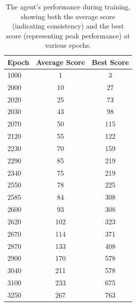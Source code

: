\documentclass[a4paper,12pt]{article}
\begin{document}
\begin{table}[!ht]
    \centering
    \begin{tabular}{|l|c|c|}
    \hline
    \textbf{Epoch} & \textbf{Average Score} & \textbf{Best Score} \\ \hline
    1000        & 1                         & 3                   \\ \hline
    2000        & 10                        & 27                  \\ \hline
    2020        & 25                        & 73                  \\ \hline
    2030        & 43                        & 98                  \\ \hline
    2070        & 50                        & 115                 \\ \hline
    2120        & 55                        & 122                 \\ \hline
    2230        & 70                        & 159                 \\ \hline
    2290        & 85                        & 219                 \\ \hline
    2340        & 75                        & 219                 \\ \hline
    2550        & 78                        & 225                 \\ \hline
    2585        & 84                        & 308                 \\ \hline
    2600        & 93                        & 308                 \\ \hline
    2620        & 102                       & 323                 \\ \hline
    2670        & 114                       & 371                 \\ \hline
    2870        & 133                       & 408                 \\ \hline
    2900        & 170                       & 578                 \\ \hline
    3040        & 211                       & 578                 \\ \hline
    3100        & 233                       & 675                 \\ \hline
    3250        & 267                       & 763                 \\ \hline
    \end{tabular}
    \caption{The agent's performance during training, showing both the average score (indicating consistency) and the best score (representing peak performance) at various epochs.}
    \label{tab:performance}
    \end{table}
\end{document}
